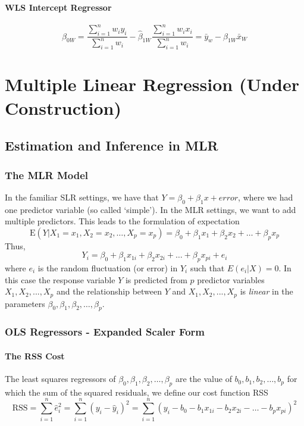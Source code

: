 \documentclass[11pt]{article}
\begin{document}
\paragraph{WLS Intercept Regressor}
\begin{equation}
    \hat{\beta}_{0 W}=\frac{\sum_{i=1}^{n} w_{i} y_{i}}{\sum_{i=1}^{n} w_{i}}-\hat{\beta}_{1 W} \frac{\sum_{i=1}^{n} w_{i} x_{i}}{\sum_{i=1}^{n} w_{i}} = \bar{y}_{w}-\hat{\beta}_{1 W} \bar{x}_{W}
\end{equation}

\section{Multiple Linear Regression (Under Construction)}
\subsection{Estimation and Inference in MLR}
\subsubsection{The MLR Model} In the familiar SLR settings, we have that $Y = \beta_0 + \beta_1 x + error$, where we had one predictor variable (so called `simple'). In the MLR settings, we want to add multiple predictors. This leads to the formulation of expectation
\begin{equation*}
    \mathrm{E}\left(Y | X_{1}=x_{1}, X_{2}=x_{2}, \ldots, X_{p}=x_{p}\right)=\beta_{0}+\beta_{1} x_{1}+\beta_{2} x_{2}+\ldots+\beta_{p} x_{p}
\end{equation*}
Thus,
\begin{equation*}
    Y_{i}=\beta_{0}+\beta_{1} x_{1 i}+\beta_{2} x_{2 i}+\ldots+\beta_{p} x_{p i}+e_{i}
\end{equation*}
where $e_i$ is the random fluctuation (or error) in $Y_i$ such that $E(e_i |X) = 0$. In this case the response variable $Y$ is predicted from $p$ predictor variables $X_1,X_2,...,X_p$ and \color{BurntOrange} the relationship between $Y$ and $X_1,X_2,...,X_p$ is \textit{linear} in the parameters $\beta_{0}, \beta_{1}, \beta_{2}, \ldots, \beta_{p}$.  \color{Black}
\subsubsection{OLS Regressors - Expanded Scaler Form}
\paragraph{The RSS Cost}
The least squares regressors of $\beta_{0}, \beta_{1}, \beta_{2}, \ldots, \beta_{p}$ are the value of $b_{0}, b_{1}, b_{2}, \ldots, b_{p}$ for which the sum of the squared residuals, we define our cost function RSS
\begin{equation*}
    \mathrm{RSS}=\sum_{i=1}^{n} \hat{e}_{i}^{2}=\sum_{i=1}^{n}\left(y_{i}-\hat{y}_{i}\right)^{2}=\sum_{i=1}^{n}\left(y_{i}-b_{0}-b_{1} x_{1 i}-b_{2} x_{2 i}-\ldots-b_{p} x_{p i}\right)^{2}
\end{equation*}
\end{document}

